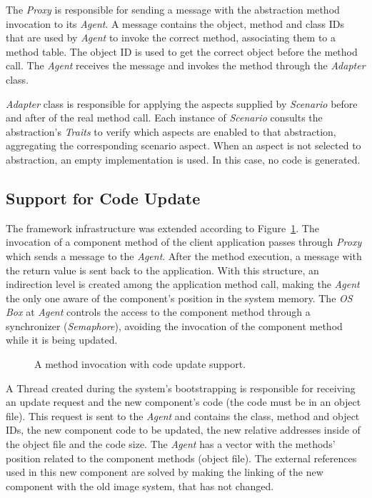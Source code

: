 \documentclass[10pt]{sigplanconf}
\newcommand{\proxy}{\textit{Proxy}}
\newcommand{\agent}{\textit{Agent}}
\newcommand{\fig}[4][tb]{
  \begin{figure}[#1] {\centering{\texttt{[image: figures/\#2]}}\par}
    \caption{#3\label{fig:#2}}
  \end{figure}
}
\begin{document}
The \proxy{} is responsible for sending a message with the abstraction method invocation to its \agent{}. A message contains the object, method and class IDs that are used by \agent{} to invoke the correct method, associating them to a method table. The object ID is used to get the correct object before the method call. The \agent{} receives the message and invokes the method through the \textit{Adapter} class.

\textit{Adapter} class is responsible for applying the aspects supplied by \textit{Scenario} before and after of the real method call. Each instance of \textit{Scenario} consults the abstraction's \textit{Traits} to verify which aspects are enabled to that abstraction, aggregating the corresponding scenario aspect. When an aspect is not selected to abstraction, an empty implementation is used. In this case, no code is generated.


\subsection{Support for Code Update}

The framework infrastructure was extended according to Figure~\ref{fig:update.pdf}. The invocation of a component method of the client application passes through \proxy{} which sends a message to the \agent{}. After the method execution, a message with the return value is sent back to the application. With this structure, an indirection level is created among the application method call, making the \agent{} the only one aware of the component's position in the system memory. The \textit{OS Box} at \agent{} controls the access to the component method through a synchronizer (\textit{Semaphore}), avoiding the invocation of the component method while it is being updated.

\fig{update.pdf}{A method invocation with code update support.}{width=5.5cm}

A Thread created during the system's bootstrapping is responsible for receiving an update request and the new component's code (the code must be in an object file). This request is sent to the \agent{} and contains the class, method and object IDs, the new component code to be updated, the new relative addresses inside of the object file and the code size. The \agent{} has a vector with the methods' position related to the component methods (object file). The external references used in this new component are solved by making the linking of the new component with the old image system, that has not changed. 
\end{document}
